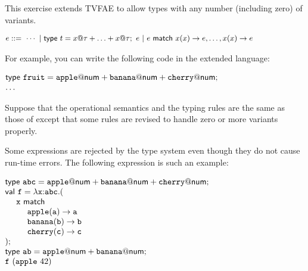 \begin{exercise}

This exercise extends \textsf{TVFAE} to allow types with any number (including zero) of variants.

\vspace{0.5em}
$
    \small
  \begin{array}{@{}l}
    e ::=\ \cdots\ |\ {\textsf{type}}\ t=x@\tau+\ldots+x@\tau;\ e\ |\
           e\ {\textsf{match}}\ x(x)\rightarrow e,\ldots,x(x)\rightarrow e \\
  \end{array}
$

For example, you can write the following code in the extended language:

\vspace{0.5em}
$
  \begin{array}{@{}l}
    {\textsf{type}}\ \code{fruit}=\code{apple}@\tnum+\code{banana}@\tnum+\code{cherry}@\tnum;\\
    \ldots
  \end{array}
$
\vspace{0.5em}

Suppose that the operational semantics and the typing rules are the same as
those of \code{TVFAE} except that some rules are revised to handle zero or more
variants properly.

Some expressions are rejected by the type system even though
they do not cause run-time errors. The following expression is such an example:

\vspace{0.5em}
$
  \begin{array}{@{}l}
    \textsf{type}\ \code{abc}=\code{apple}@\tnum+\code{banana}@\tnum+\code{cherry}@\tnum;\\
    \textsf{val}\ \code{f}=\efun{\code{x}{:}\code{abc}}{(}\\
    \ \ \ \ \code{x}\ \textsf{match} \\
    \ \ \ \ \ \ \ \ \code{apple}(\code{a})\rightarrow\code{a} \\
    \ \ \ \ \ \ \ \ \code{banana}(\code{b})\rightarrow\code{b} \\
    \ \ \ \ \ \ \ \ \code{cherry}(\code{c})\rightarrow\code{c} \\
    );\\
    \textsf{type}\ \code{ab}=\code{apple}@\tnum+\code{banana}@\tnum;\\
    \eapp{\code{f}}{(\eapp{\code{apple}}{42})}
  \end{array}
$
\vspace{0.5em}


\end{exercise}
